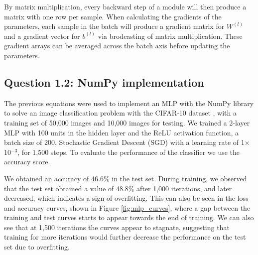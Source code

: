 \documentclass{article}
\begin{document}
By matrix multiplication, every backward step of a module will then produce a matrix with one row per sample. When calculating the gradients of the parameters, each sample in the batch will produce a gradient matrix for $W^{(l)}$ and a gradient vector for $b^{(l)}$ via brodcasting of matrix multiplication. These gradient arrays can be averaged across the batch axis before updating the parameters.

\subsection*{Question 1.2: NumPy implementation}
\label{sec:numpy}

The previous equations were used to implement an MLP with the NumPy library to solve an image classification problem with the CIFAR-10 dataset \cite{krizhevsky2009learning}, with a training set of 50,000 images and 10,000 images for testing. We trained a 2-layer MLP with 100 units in the hidden layer and the ReLU activation function, a batch size of 200, Stochastic Gradient Descent (SGD) with a learning rate of 1$\times$10$^{-3}$, for 1,500 steps. To evaluate the performance of the classifier we use the accuracy score.

We obtained an accuracy of 46.6\% in the test set. During training, we observed that the test set obtained a value of 48.8\% after 1,000 iterations, and later decreased, which indicates a sign of overfitting. This can also be seen in the loss and accuracy curves, shown in Figure \ref{fig:mlp_curves}, where a gap between the training and test curves starts to appear towards the end of training. We can also see that at 1,500 iterations the curves appear to stagnate, suggesting that training for more iterations would further decrease the performance on the test set due to overfitting.
\end{document}
